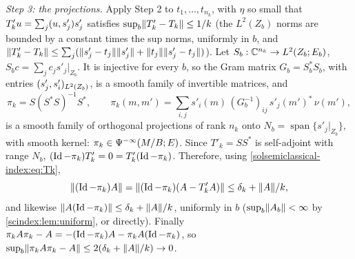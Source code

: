 \emph{Step 3: the projections.} Apply Step 2 to $t_1,\dots,t_{n_k}$, with $\eta$ so
small that $T'_ku=\sum_j( u, s'_j)s'_j$ satisfies $\sup_b\lVert T'_k-T_k\rVert\le1/k$
(the $L^2(Z_b)$ norms are bounded by a constant times the sup norms, uniformly in
$b$, and $\lVert T'_k-T_k\rVert\le\sum_j(\lVert s'_j-t_j\rVert\lVert s'_j\rVert+\lVert t_j\rVert
\lVert s'_j-t_j\rVert)$). Let $S_b:\mathbb{C}^{n_k}\to L^2(Z_b;E_b)$, $S_bc=\sum_jc_js'_j|_{Z_b}$.
It is injective for every $b$, so the Gram matrix $G_b=S_b^*S_b$, with entries
$( s'_j, s'_i)_{L^2(Z_b)}$, is a smooth family of invertible matrices, and
\begin{equation*}
  \pi_k=S(S^*S)^{-1}S^*,\qquad
  \pi_k(m,m')=\sum_{i,j}s'_i(m)\,(G_b^{-1})_{ij}\,s'_j(m')^*\,\nu(m'),
\end{equation*}
is a smooth family of orthogonal projections of rank $n_k$ onto
$N_b=\operatorname{span}\{s'_j|_{Z_b}\}$, with smooth kernel: $\pi_k\in
\Psi^{-\infty}(M/B;E)$. Since $T'_k=SS^*$ is self-adjoint with range $N_b$,
$(\operatorname{Id}-\pi_k)T'_k=0=T'_k(\operatorname{Id}-\pi_k)$. Therefore, using
\eqref{solsemiclassical-index:eq:Tk},
\begin{equation*}
  \lVert (\operatorname{Id}-\pi_k)A\rVert=\lVert (\operatorname{Id}-\pi_k)(A-T'_kA)\rVert\le\delta_k+\lVert A\rVert/k,
\end{equation*}
and likewise $\lVert A(\operatorname{Id}-\pi_k)\rVert\le\delta_k+\lVert A\rVert/k$, uniformly in $b$
($\sup_b\lVert A_b\rVert<\infty$ by \cref{scindex:lem:uniform}, or directly). Finally
$\pi_kA\pi_k-A=-(\operatorname{Id}-\pi_k)A-\pi_kA(\operatorname{Id}-\pi_k)$, so
$\sup_b\lVert \pi_kA\pi_k-A\rVert\le2(\delta_k+\lVert A\rVert/k)\to0$.

